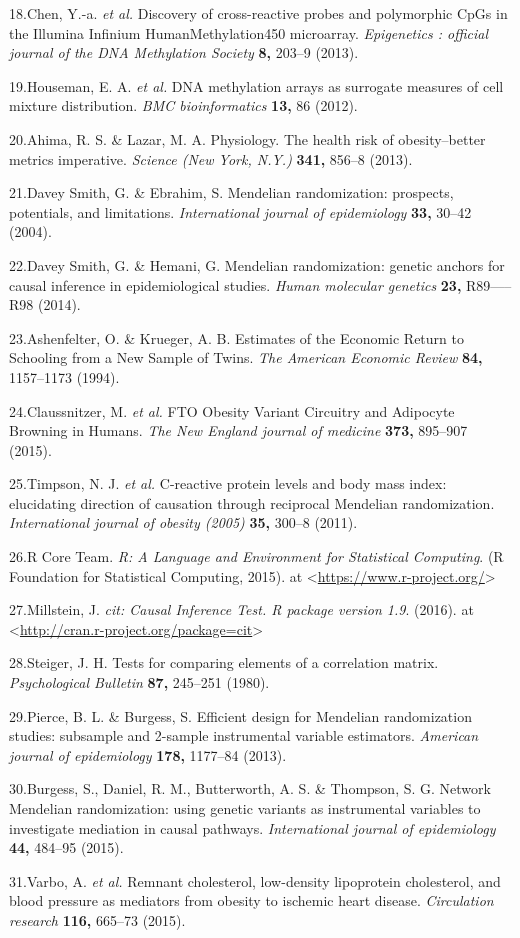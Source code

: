 \documentclass[]{article}
\begin{document}
18.Chen, Y.-a. \emph{et al.} Discovery of cross-reactive probes and
polymorphic CpGs in the Illumina Infinium HumanMethylation450
microarray. \emph{Epigenetics : official journal of the DNA Methylation
Society} \textbf{8,} 203--9 (2013).

19.Houseman, E. A. \emph{et al.} DNA methylation arrays as surrogate
measures of cell mixture distribution. \emph{BMC bioinformatics}
\textbf{13,} 86 (2012).

20.Ahima, R. S. \& Lazar, M. A. Physiology. The health risk of
obesity--better metrics imperative. \emph{Science (New York, N.Y.)}
\textbf{341,} 856--8 (2013).

21.{Davey Smith}, G. \& Ebrahim, S. Mendelian randomization: prospects,
potentials, and limitations. \emph{International journal of
epidemiology} \textbf{33,} 30--42 (2004).

22.{Davey Smith}, G. \& Hemani, G. Mendelian randomization: genetic
anchors for causal inference in epidemiological studies. \emph{Human
molecular genetics} \textbf{23,} R89-----R98 (2014).

23.Ashenfelter, O. \& Krueger, A. B. Estimates of the Economic Return to
Schooling from a New Sample of Twins. \emph{The American Economic
Review} \textbf{84,} 1157--1173 (1994).

24.Claussnitzer, M. \emph{et al.} FTO Obesity Variant Circuitry and
Adipocyte Browning in Humans. \emph{The New England journal of medicine}
\textbf{373,} 895--907 (2015).

25.Timpson, N. J. \emph{et al.} C-reactive protein levels and body mass
index: elucidating direction of causation through reciprocal Mendelian
randomization. \emph{International journal of obesity (2005)}
\textbf{35,} 300--8 (2011).

26.R Core Team. \emph{R: A Language and Environment for Statistical
Computing}. (R Foundation for Statistical Computing, 2015). at
\textless{}\url{https://www.r-project.org/}\textgreater{}

27.Millstein, J. \emph{cit: Causal Inference Test. R package version
1.9}. (2016). at
\textless{}\url{http://cran.r-project.org/package=cit}\textgreater{}

28.Steiger, J. H. Tests for comparing elements of a correlation matrix.
\emph{Psychological Bulletin} \textbf{87,} 245--251 (1980).

29.Pierce, B. L. \& Burgess, S. Efficient design for Mendelian
randomization studies: subsample and 2-sample instrumental variable
estimators. \emph{American journal of epidemiology} \textbf{178,}
1177--84 (2013).

30.Burgess, S., Daniel, R. M., Butterworth, A. S. \& Thompson, S. G.
Network Mendelian randomization: using genetic variants as instrumental
variables to investigate mediation in causal pathways.
\emph{International journal of epidemiology} \textbf{44,} 484--95
(2015).

31.Varbo, A. \emph{et al.} Remnant cholesterol, low-density lipoprotein
cholesterol, and blood pressure as mediators from obesity to ischemic
heart disease. \emph{Circulation research} \textbf{116,} 665--73 (2015).
\end{document}
